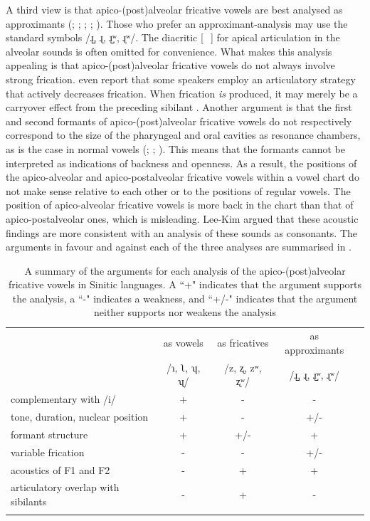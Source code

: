 \documentclass[output=paper,colorlinks,citecolor=brown,chinesefont]{langscibook}
\begin{document}
\largerpage
A third view is that apico-(post)alveolar fricative vowels are best analysed as approximants (\cite{Lee&Zee_2003}; \cite{Lee-Kim_2014}; \cite{Li&Zhang_2017}; \cite{Huang&al_2021}; \cite{Kong_et_al_2022}). Those who prefer an approximant-analysis may use the standard symbols /ɹ̺, ɻ, ɹ̺ʷ, ɻʷ/. The diacritic [\textcolor{white}{X}̺] for apical articulation in the alveolar sounds is often omitted for convenience. What makes this analysis appealing is that apico-(post)alveolar fricative vowels do not always involve strong frication. \citet{faytak&lin_2015} even report that some speakers employ an articulatory strategy that actively decreases frication. When frication \textit{is} produced, it may merely be a carryover effect from the preceding sibilant \citep[274]{Lee-Kim_2014}. Another argument is that the first and second formants of apico-(post)alveolar fricative vowels do not respectively correspond to the size of the pharyngeal and oral cavities as resonance chambers, as is the case in normal vowels (\cite{Ling_2007}; \cite{Ling_2009}; \cite{Lee-Kim_2014}). This means that the formants cannot be interpreted as indications of backness and openness. As a result, the positions of the apico-alveolar and apico-postalveolar fricative vowels within a vowel chart do not make sense relative to each other or to the positions of regular vowels. The position of apico-alveolar fricative vowels is more back in the chart than that of apico-postalveolar ones, which is misleading. Lee-Kim argued that these acoustic findings are more consistent with an analysis of these sounds as consonants. The arguments in favour and against each of the three analyses are summarised in .

\begin{table}
    \caption{A summary of the arguments for each analysis of the apico-(post)alveolar fricative vowels in Sinitic languages. A ``+" indicates that the argument supports the analysis, a ``-" indicates a weakness, and ``+/-" indicates that the argument neither supports nor weakens the analysis}
\label{tab:arguments}
 \begin{tabularx}{\textwidth}{Q cccc}
  \lsptoprule
     & as vowels & as fricatives & as approximants \\
    & /ɿ, ʅ, ʮ, ʯ/ & /z, ʐ, zʷ, ʐʷ/ & /ɹ̺, ɻ, ɹ̺ʷ, ɻʷ/ \\
  \midrule
complementary with /i/ & + & - & - \\
\tablevspace
tone, duration, nuclear position & + & - & +/-\\
\tablevspace
formant structure & + & +/- & + \\
\tablevspace
variable frication & - & - & +/- \\
\tablevspace
acoustics of F1 and F2 & - & + & + \\
\tablevspace
articulatory overlap with sibilants & - & + & - \\
  \lspbottomrule
 \end{tabularx}
\end{table}
\end{document}

